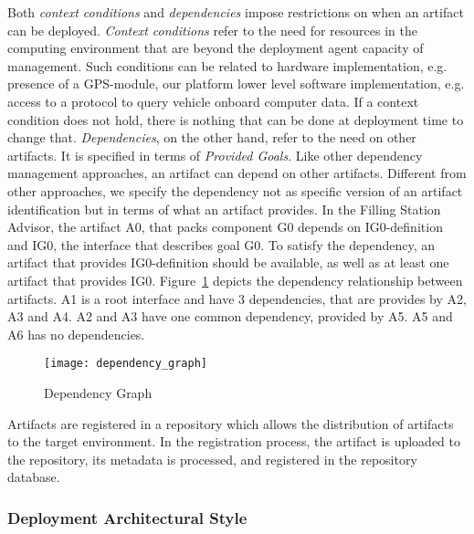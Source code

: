 Both \emph{context conditions} and \emph{dependencies} impose restrictions on when an artifact can be deployed.
\emph{Context conditions} refer to the need for resources in the computing environment that are beyond the deployment agent capacity of management. Such conditions can be related to hardware implementation, e.g. presence of a GPS-module, our platform lower level software implementation, e.g. access to a protocol to query vehicle onboard computer data. If a context condition does not hold, there is nothing that can be done at deployment time to change that.
\emph{Dependencies}, on the other hand, refer to the need on other artifacts. It is specified in terms of \emph{Provided Goals}. Like other dependency management approaches, an artifact can depend on other artifacts.
Different from other approaches, we specify the dependency not as specific version of an artifact identification but in terms of what an artifact provides.
In the Filling Station Advisor, the artifact A0, that packs component G0 depends on IG0-definition and IG0, the interface that describes goal G0. To satisfy the dependency, an artifact that provides IG0-definition should be available, as well as at least one artifact that provides IG0. Figure~\ref{fig:dependency_graph} depicts the dependency relationship between artifacts. A1 is a root interface and have 3 dependencies, that are provides by A2, A3 and A4. A2 and A3 have one common dependency, provided by A5. A5 and A6 has no dependencies.

\begin{figure}[!htb]
  \centering
  \texttt{[image: dependency\_graph]}
  \caption{Dependency Graph}
  \label{fig:dependency_graph}
\end{figure}

Artifacts are registered in a repository which allows the distribution of artifacts to the target environment. In the registration process, the artifact is uploaded to the repository, its metadata is processed, and registered in the repository database.


\subsubsection{Deployment Architectural Style}
\label{depl_arch_style}

